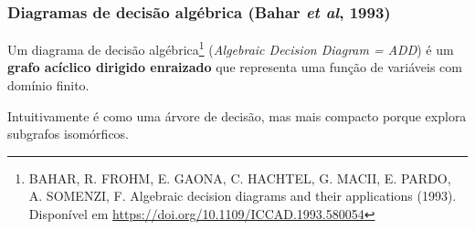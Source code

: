 \documentclass[dvipsnames]{beamer}
\begin{document}
  \begin{frame}
    \frametitle{Diagramas de decisão algébrica (Bahar \emph{et al}, 1993)}

    Um diagrama de decisão algébrica\footnote{\scriptsize BAHAR, R. FROHM, E. GAONA, C. HACHTEL, G. MACII, E. PARDO, A. SOMENZI, F. Algebraic decision diagrams and their applications (1993). Disponível em \url{https://doi.org/10.1109/ICCAD.1993.580054}} (\emph{Algebraic Decision Diagram = ADD}) é um \textbf{grafo acíclico dirigido enraizado} que representa uma função de variáveis com domínio finito.

    \vspace{1em}

    Intuitivamente é como uma árvore de decisão, mas mais compacto porque explora subgrafos isomórficos.
  \end{frame}
\end{document}
